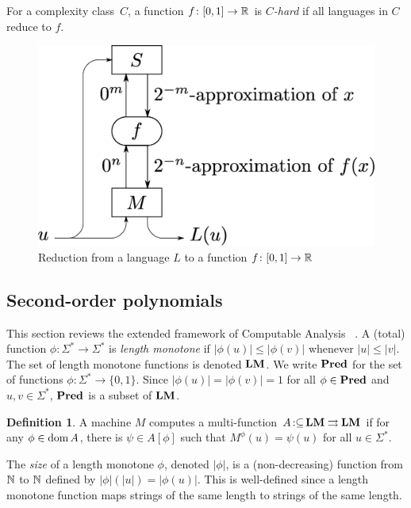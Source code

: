 \documentclass{article}
\theoremstyle{definition}
\newtheorem{definition}[theorem]{Definition}
\theoremstyle{remark}
\newcommand{\pcolon}{\mathpunct{\,:\subseteq}}
\begin{document}
For a complexity class~$C$, a function $f \colon [0, 1] \to \mathbb R$ is \emph{$C$-hard}
if all languages in $C$ reduce to $f$.

 \begin{figure}
  \begin{center}
  \includegraphics[scale=0.25]{image/reduction.eps}
  \caption{Reduction from a language $L$ to a function $f \colon [0,1] \to \mathbb R$}
  \label{fig:reduction}
  \end{center}
 \end{figure}

\subsection{Second-order polynomials}
\label{section:TTF}

This section reviews the extended framework of Computable Analysis~%
\cite{kawamura2012complexity}.
A (total) function $\phi \colon \Sigma^* \to \Sigma^*$ is \emph{length monotone}
if  $|\phi(u)| \le |\phi(v)|$ whenever $|u| \le |v|$.
The set of length monotone functions is denoted $\mathbf{LM}$.
We write $\mathbf{Pred}$ for the set of functions $\phi \colon \Sigma^* \to \{0, 1\}$.
Since $|\phi(u)| = |\phi(v)| = 1$ for all $\phi \in \mathbf{Pred}$ and $u, v \in \Sigma^*$,
$\mathbf{Pred}$ is a subset of $\mathbf{LM}$.

\begin{definition}
 A machine $M$ computes a multi-function $A \pcolon \LM \rightrightarrows \LM$ if for any
 $\phi \in \mathop{\rm dom} A$, there is $\psi \in A[\phi]$ such that $M^\phi(u) = \psi(u)$ for all $u \in \Sigma^*$.
\end{definition}

The \emph{size} of a length monotone $\phi$, denoted $|\phi|$,
is a (non-decreasing) function from $\mathbb N$ to $\mathbb N$ defined by 
$|\phi|(|u|) = |\phi(u)|$.
This is well-defined since a length monotone function maps 
strings of the same length to strings of the same length.
\end{document}
